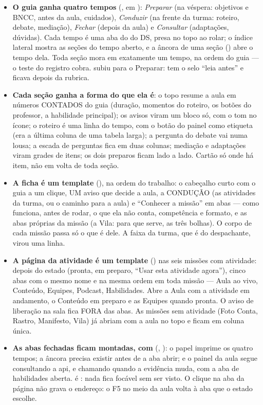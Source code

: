 \begin{itemize}
  \item \textbf{O guia ganha quatro tempos} (, em
    ): \emph{Preparar} (na véspera:
    objetivos e BNCC, antes da aula, cuidados), \emph{Conduzir} (na frente da
    turma: roteiro, debate, mediação), \emph{Fechar} (depois da aula) e
    \emph{Consultar} (adaptações, dúvidas). Cada tempo é uma aba do 
    do DS, presa no topo ao rolar; o índice lateral mostra as seções do tempo
    aberto, e a âncora de uma seção () abre o tempo dela. Toda
    seção mora em exatamente um tempo, na ordem do guia --- o teste do
    registro cobra.  subiu para o Preparar: tem o selo
    \enquote{leia antes} e ficava depois da rubrica.
  \item \textbf{Cada seção ganha a forma do que ela é}: o topo resume a aula em
    números CONTADOS do guia (duração, momentos do roteiro, os botões do
    professor, a habilidade principal); os avisos viram um bloco só, com o tom
    no ícone; o roteiro é uma linha do tempo, com o botão do painel como
    etiqueta (era a última coluna de uma tabela larga); a pergunta do debate
    vai numa lousa; a escada de perguntas fica em duas colunas; mediação e
    adaptações viram grades de itens; os dois preparos ficam lado a lado.
    Cartão só onde há item, não em volta de toda seção.
  \item \textbf{A ficha é um template}
    (), na ordem do trabalho: o
    cabeçalho curto com o guia a um clique, UM aviso que decide a aula, a
    CONDUÇÃO (as atividades da turma, ou o caminho para a aula) e
    \enquote{Conhecer a missão} em abas --- como funciona, antes de rodar, o
    que ela não conta, competência e formato, e as abas próprias da missão (a
    Vila: para que serve, as três bolhas). O corpo de cada missão passa só o
    que é dele. A faixa da turma, que é do despachante, virou uma linha.
  \item \textbf{A página da atividade é um template}
    () nas seis missões com
    atividade: depois do estado (pronta, em preparo, \enquote{Usar esta
    atividade agora}), cinco abas com o mesmo nome e na mesma ordem em toda
    missão --- Aula ao vivo, Conteúdo, Equipes, Podcast, Habilidades. Abre a
    Aula com a atividade em andamento, o Conteúdo em preparo e as Equipes
    quando pronta. O aviso de liberação na sala fica FORA das abas. As missões
    sem atividade (Foto Conta, Rastro, Manifesto, Vila) já abriam com a aula
    no topo e ficam em coluna única.
  \item \textbf{As abas fechadas ficam montadas, com }
    (, ):
    o papel imprime os quatro tempos; a âncora precisa existir antes de a aba
    abrir; e o painel da aula segue consultando a api, e chamando
     quando a evidência muda, com a aba de habilidades
    aberta.  é : nada fica focável sem ser visto.
    O clique na aba da página não grava o endereço: o F5 no meio da aula volta
    à aba que o estado escolhe.
\end{itemize}

